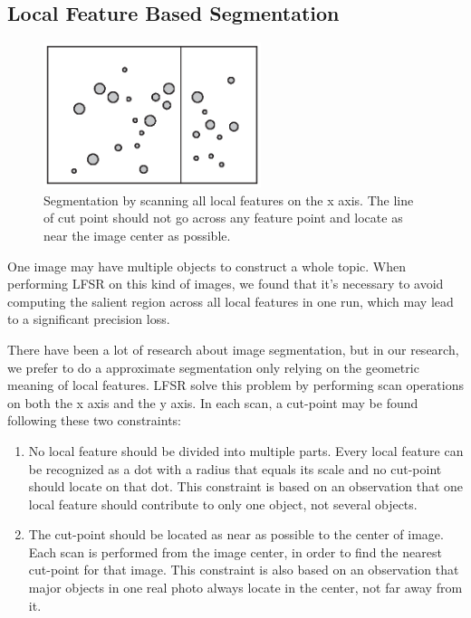 \subsection{Local Feature Based Segmentation}
\label{sec:algorithm_segmentation}

\begin{figure}[!t]
\centering
\includegraphics[width=2.5in]{images/fig-segmentation.eps}
\caption{Segmentation by scanning all local features on the x axis. The line of cut point should not go across any feature point and locate as near the image center as possible.}
\label{fig:segmentation}
\end{figure}

One image may have multiple objects to construct a whole topic. When performing LFSR on this kind of images, we found that it's necessary to avoid computing the salient region across all local features in one run, which may lead to a significant precision loss.

There have been a lot of research about image segmentation, but in our research, we prefer to do a approximate segmentation only relying on the geometric meaning of local features. LFSR solve this problem by performing scan operations on both the x axis and the y axis. In each scan, a cut-point may be found following these two constraints:

\begin{enumerate}

  \item No local feature should be divided into multiple parts. Every local feature can be recognized as a dot with a radius that equals its scale and no cut-point should locate on that dot. This constraint is based on an observation that one local feature should contribute to only one object, not several objects.

  \item The cut-point should be located as near as possible to the center of image. Each scan is performed from the image center, in order to find the nearest cut-point for that image. This constraint is also based on an observation that major objects in one real photo always locate in the center, not far away from it.

\end{enumerate}

